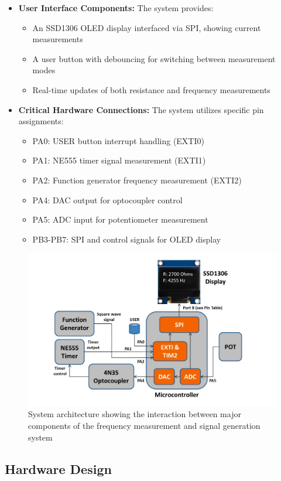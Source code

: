 \begin{itemize}
    \item \textbf{User Interface Components:} The system provides:
    \begin{itemize}
        \item An SSD1306 OLED display interfaced via SPI, showing current measurements
        \item A user button with debouncing for switching between measurement modes
        \item Real-time updates of both resistance and frequency measurements
    \end{itemize}
    \item \textbf{Critical Hardware Connections:} The system utilizes specific pin assignments:
    \begin{itemize}
        \item PA0: USER button interrupt handling (EXTI0)
        \item PA1: NE555 timer signal measurement (EXTI1)
        \item PA2: Function generator frequency measurement (EXTI2)
        \item PA4: DAC output for optocoupler control
        \item PA5: ADC input for potentiometer measurement
        \item PB3-PB7: SPI and control signals for OLED display
    \end{itemize}
\end{itemize}

\begin{figure}[tbph]
  \centering
  \includegraphics[width=0.7\linewidth]{graphics/system_blocks}
  \caption{System architecture showing the interaction between major components of the frequency measurement and signal generation system}
  \label{fig:systemblocks}
\end{figure}

\subsection{Hardware Design}
